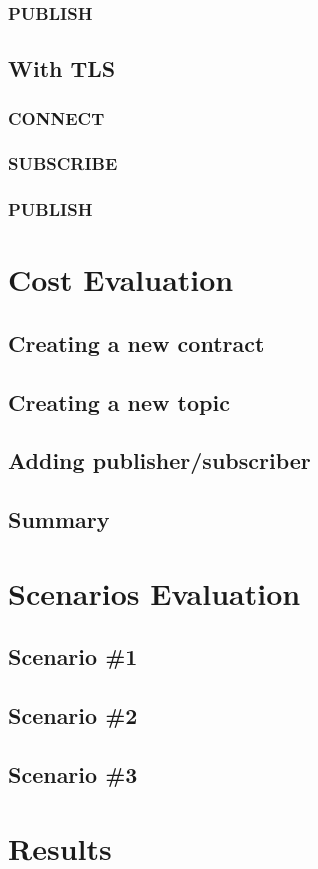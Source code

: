 \subsubsection{PUBLISH}

\subsection{With TLS}
\subsubsection{CONNECT}
\subsubsection{SUBSCRIBE}
\subsubsection{PUBLISH}

\section{Cost Evaluation}
\subsection{Creating a new contract}
\subsection{Creating a new topic}
\subsection{Adding publisher/subscriber}
\subsection{Summary}

\section{Scenarios Evaluation}
\subsection{Scenario \#1}
\subsection{Scenario \#2}
\subsection{Scenario \#3}

\section{Results}
